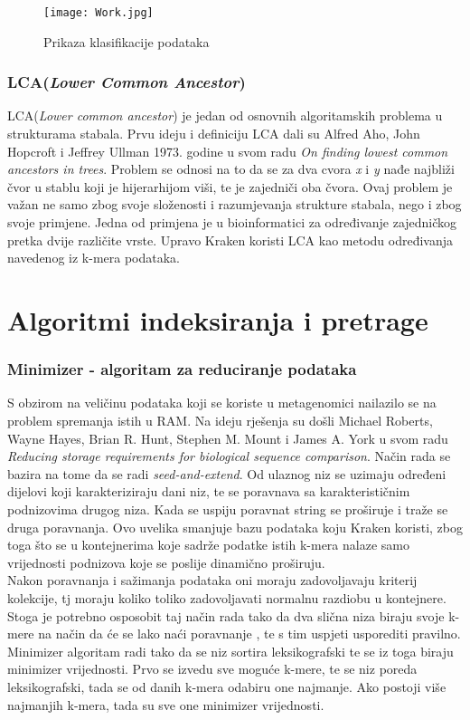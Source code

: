 \documentclass[times, utf8, zavrsni]{fer}
\begin{document}
{\begin{figure}[!htbp]
	\centering
	\texttt{[image: Work.jpg]}
	\caption{Prikaza klasifikacije podataka}
	\label{Klasifikacija}
\end{figure}


\newpage
\subsection{LCA(\textit{Lower Common Ancestor})}
LCA(\textit{Lower common ancestor}) je jedan od osnovnih algoritamskih problema u strukturama stabala. Prvu ideju i definiciju LCA dali su Alfred Aho, John Hopcroft i Jeffrey Ullman 1973. godine u svom radu \textit{On finding lowest common ancestors in trees}. Problem se odnosi na to da se za dva cvora \textit{x} i \textit{y} nađe najbliži čvor u stablu koji je hijerarhijom viši, te je zajedniči oba čvora. Ovaj problem je važan ne samo zbog svoje složenosti i razumjevanja strukture stabala, nego i zbog svoje primjene. Jedna od primjena je u bioinformatici za određivanje zajedničkog pretka dvije različite vrste. Upravo Kraken koristi LCA kao metodu određivanja navedenog iz k-mera podataka.
\chapter{Algoritmi indeksiranja i pretrage}
\subsection{Minimizer - algoritam za reduciranje podataka}
S obzirom na veličinu podataka koji se koriste u metagenomici nailazilo se na problem spremanja istih u RAM. Na ideju rješenja su došli Michael Roberts, Wayne Hayes, Brian R. Hunt, Stephen M. Mount i James A. York u svom radu \textit{Reducing storage requirements for biological sequence comparison}. Način rada se bazira na tome da se radi \textit{seed-and-extend}. Od ulaznog niz se uzimaju određeni dijelovi koji karakteriziraju dani niz, te se poravnava sa karakterističnim podnizovima drugog niza. Kada se uspiju poravnat string se proširuje i traže se druga poravnanja. Ovo uvelika smanjuje bazu podataka koju Kraken koristi, zbog toga što se u kontejnerima koje sadrže podatke istih k-mera nalaze samo vrijednosti podnizova koje se poslije dinamično proširuju.\\Nakon poravnanja i sažimanja podataka oni moraju zadovoljavaju kriterij kolekcije, tj moraju koliko toliko zadovoljavati normalnu razdiobu u kontejnere. Stoga je potrebno osposobit taj način rada tako da dva slična niza biraju svoje k-mere na način da će se lako naći poravnanje , te  s tim uspjeti usporediti pravilno. \\Minimizer algoritam radi tako da se niz sortira leksikografski te se iz toga biraju minimizer vrijednosti. Prvo se izvedu sve moguće k-mere, te se niz poreda leksikografski, tada se od danih k-mera odabiru one najmanje. Ako postoji više najmanjih k-mera, tada su sve one minimizer vrijednosti.


}
\end{document}
